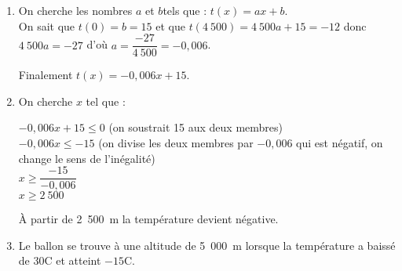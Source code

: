 \begin{enumerate}
	 \item On cherche les nombres $a$ et $b$tels que : $t(x) = ax + b$.\\
	 On sait que $t(0) = b = 15$ et que $t(4~500) = 4~500a + 15 = -12$ donc $4~500a=-27$ d'où $a=\dfrac{-27}{4~500}=-0,006$.
	 
	 \medskip
	 Finalement $t(x) = -0,006x + 15$.
	 
	 \item On cherche $x$ tel que : 
	 
	 \begin{spacing}{2}
     $-0,006x + 15 \leq 0$ (on soustrait 15 aux deux membres)\\
	 $-0,006x \leq -15$ (on divise les deux membres par $-0,006$ qui est négatif, on change le sens de l'inégalité)\\
	 $x \geq \dfrac{-15}{-0,006}$\\
	 $x \geq 2~500$	
	 \end{spacing}
	 
	 
	 
	 \medskip
	 À partir de 2~500~m la température devient négative.
	 
	 \item Le ballon se trouve à une altitude de 5~000~m lorsque la température a baissé de 30\degree C et atteint $-15$\degree C.
\end{enumerate}